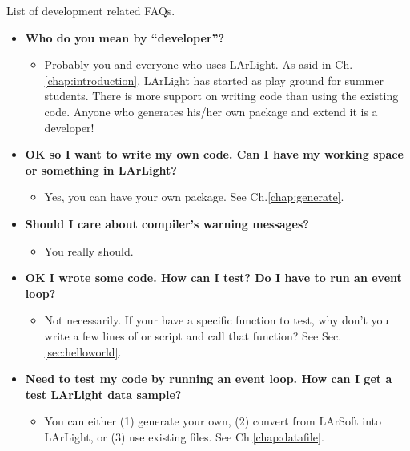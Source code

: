 List of development related FAQs.

\begin{itemize}

\item[] {\bf Who do you mean by ``developer''?}
  \begin{itemize}
    \item Probably you and everyone who uses LArLight. As asid in Ch.\ref{chap:introduction}, LArLight has started as \CPP play ground for summer students. There is more support on writing code than using the existing code. Anyone who generates his/her own package and extend it is a developer!
  \end{itemize}

\item[] {\bf OK so I want to write my own code. Can I have my working space or something in LArLight?}
  \begin{itemize}
    \item Yes, you can have your own package. See Ch.\ref{chap:generate}.
  \end{itemize}

\item[] {\bf Should I care about compiler's warning messages?}
  \begin{itemize}
    \item You really should.
  \end{itemize}

\item[] {\bf OK I wrote some code. How can I test? Do I have to run an event loop?}
  \begin{itemize}
    \item Not necessarily. If your have a specific function to test, why don't you write a few lines of \PyROOT or \CINT script and call that function? See Sec.\ref{sec:helloworld}.
  \end{itemize}

\item[] {\bf Need to test my code by running an event loop. How can I get a test LArLight data sample?}
  \begin{itemize}
    \item You can either (1) generate your own, (2) convert from LArSoft into LArLight, or (3) use existing files. See Ch.\ref{chap:datafile}.
  \end{itemize}


\end{itemize}
